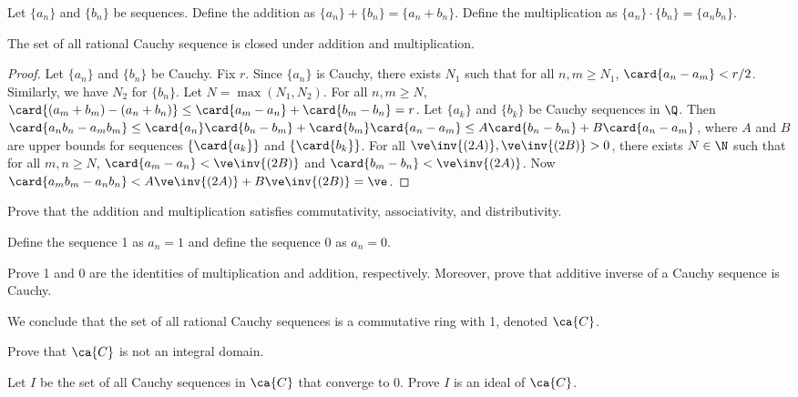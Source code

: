 \documentclass[10pt]{article}
\begin{document}
\par
Let $\{{a}_{n}\}$ and $\{{b}_{n}\}$ be sequences. Define the addition as $\{{a}_{n}\}+\{{b}_{n}\}=\{{a}_{n}+{b}_{n}\}$. Define the multiplication as $\{{a}_{n}\}\cdot\{{b}_{n}\}=\{{a}_{n}{b}_{n}\}$. 
\begin{proposition}
    The set of all rational Cauchy sequence is closed under addition and multiplication.
\end{proposition}
\begin{proof}
    Let $\{{a}_{n}\}$ and $\{{b}_{n}\}$ be Cauchy. Fix $r$. Since $\{{a}_{n}\}$ is Cauchy, there exists ${N}_{1}$ such that for all $n,m\ge{N}_{1}$, $\card{{a}_{n}-{a}_{m}}<r/2$. Similarly, we have ${N}_{2}$ for $\{{b}_{n}\}$. Let $N=\max({N}_{1},{N}_{2})$. For all $n,m\ge N$, $\card{({a}_{m}+{b}_{m})-({a}_{n}+{b}_{n})}\\\le\card{{a}_{m}-{a}_{n}}+\card{{b}_{m}-{b}_{n}}=r$. Let $\{{a}_{k}\}$ and $\{{b}_{k}\}$ be Cauchy sequences in $\Q$. Then $\card{{a}_{n}{b}_{n}-{a}_{m}{b}_{m}}\le\card{{a}_{n}}\card{{b}_{n}-{b}_{m}}+\card{{b}_{m}}\card{{a}_{n}-{a}_{m}}\le A\card{{b}_{n}-{b}_{m}}+B\card{{a}_{n}-{a}_{m}}$, where $A$ and $B$ are upper bounds for sequences $\{\card{{a}_{k}}\}$ and $\{\card{{b}_{k}}\}$. For all $\ve\inv{(2A)},\ve\inv{(2B)}>0$, there exists $N\in \N$ such that for all $m,n\ge N$, $\card{{a}_{m}-{a}_{n}}<\ve\inv{(2B)}$ and $\card{{b}_{m}-{b}_{n}}<\ve\inv{(2A)}$. Now $\card{{a}_{m}{b}_{m}-{a}_{n}{b}_{n}}<A\ve\inv{(2A)}+B\ve\inv{(2B)}= \ve$.
\end{proof}
\begin{problem}
    Prove that the addition and multiplication satisfies commutativity, associativity, and distributivity.
\end{problem}
\par
Define the sequence 1 as ${a}_{n}=1$ and define the sequence 0 as ${a}_{n}=0$.
\begin{problem}
    Prove 1 and 0 are the identities of multiplication and addition, respectively. Moreover, prove that additive inverse of a Cauchy sequence is Cauchy.
\end{problem}
\par
We conclude that the set of all rational Cauchy sequences is a commutative ring with 1, denoted $\ca{C}$.
\begin{problem}
    Prove that $\ca{C}$ is not an integral domain.
\end{problem}
\begin{problem}
    Let $I$ be the set of all Cauchy sequences in $\ca{C}$ that converge to 0. Prove $I$ is an ideal of $\ca{C}$.
\end{problem}
\end{document}
